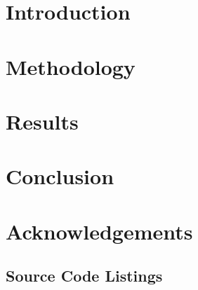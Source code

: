 \documentclass{article}
\begin{document}

\newpage

\newpage
\tableofcontents

\newpage
\section{Introduction}

\newpage
\section{Methodology}

\newpage
\section{Results}\label{section:results}

\section{Conclusion}

\section{Acknowledgements}


\newpage
\printbibliography[heading=bibintoc, title={References}]
\newpage
\begin{appendices}
\section{Source Code Listings}\label{section:source}

\end{appendices}
\end{document}
